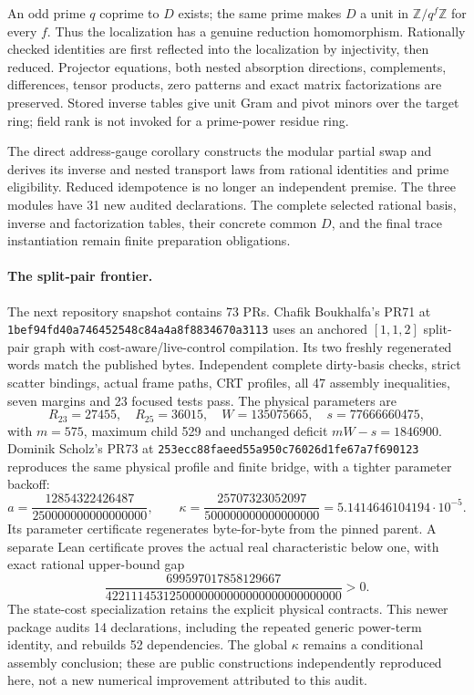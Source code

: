 \documentclass[11pt]{article}
\begin{document}
An odd prime $q$ coprime to $D$ exists; the same prime makes $D$ a unit in
$\mathbb Z/q^f\mathbb Z$ for every $f$. Thus the localization has a genuine
reduction homomorphism. Rationally checked identities are first reflected
into the localization by injectivity, then reduced. Projector equations,
both nested absorption directions, complements, differences, tensor products,
zero patterns and exact matrix factorizations are preserved. Stored inverse
tables give unit Gram and pivot minors over the target ring; field rank is
not invoked for a prime-power residue ring.

The direct address-gauge corollary constructs the modular partial swap and
derives its inverse and nested transport laws from rational identities and
prime eligibility. Reduced idempotence is no longer an independent premise.
The three modules have 31 new audited declarations. The complete selected
rational basis, inverse and factorization tables, their concrete common $D$,
and the final trace instantiation remain finite preparation obligations.

\paragraph{The split-pair frontier.}
The next repository snapshot contains 73 PRs. Chafik Boukhalfa's PR71 at
\texttt{1bef94fd40a746452548c84a4a8f8834670a3113} uses an anchored
$[1,1,2]$ split-pair graph with cost-aware/live-control compilation.
Its two freshly regenerated words match the published bytes. Independent
complete dirty-basis checks, strict scatter bindings, actual frame paths,
CRT profiles, all 47 assembly inequalities, seven margins and 23 focused
tests pass. The physical parameters are
\[
 R_{23}=27455,\quad R_{25}=36015,\quad
 W=135075665,\quad s=77666660475,
\]
with $m=575$, maximum child 529 and unchanged deficit $mW-s=1846900$.
Dominik Scholz's PR73 at \texttt{253ecc88faeed55a950c76026d1fe67a7f690123} reproduces
the same physical profile and finite bridge, with a tighter parameter backoff:
\[
 a=\frac{12854322426487}{250000000000000000},\qquad
 \kappa=\frac{25707323052097}{500000000000000000}
       =5.1414646104194\cdot10^{-5}.
\]
Its parameter certificate regenerates byte-for-byte from the pinned parent.
A separate Lean certificate proves the actual real characteristic below one,
with exact rational upper-bound gap
\[
 \frac{699597017858129667}
 {4221114531250000000000000000000000000}>0.
\]
The state-cost specialization retains the explicit physical contracts.
This newer package audits 14 declarations, including the repeated generic
power-term identity, and rebuilds 52 dependencies. The global $\kappa$
remains a conditional assembly conclusion; these are public constructions
independently reproduced here, not a new numerical improvement attributed
to this audit.
\end{document}
